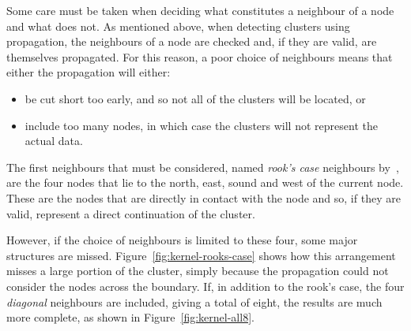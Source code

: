 Some care must be taken when deciding what constitutes a neighbour of a node
and what does not. As mentioned above, when detecting clusters using
propagation, the neighbours of a node are checked and, if they are valid, are
themselves propagated. For this reason, a poor choice of neighbours means that
either the propagation will either:

\begin{itemize}
	\item be cut short too early, and so not all of the clusters will be
		located, or
	\item include too many nodes, in which case the clusters will not represent
		the actual data.
\end{itemize}

The first neighbours that must be considered, named \emph{rook's case}
neighbours by~\cite{abel1990comparative}, are the four nodes that lie to the
north, east, sound and west of the current node. These are the nodes that are
directly in contact with the node and so, if they are valid, represent a direct
continuation of the cluster.

However, if the choice of neighbours is limited to these four, some major
structures are missed. Figure~\ref{fig:kernel-rooks-case} shows how this
arrangement misses a large portion of the cluster, simply because the
propagation could not consider the nodes across the boundary. If, in addition
to the rook's case, the four \emph{diagonal} neighbours are included, giving a
total of eight, the results are much more complete, as shown in
Figure~\ref{fig:kernel-all8}.

